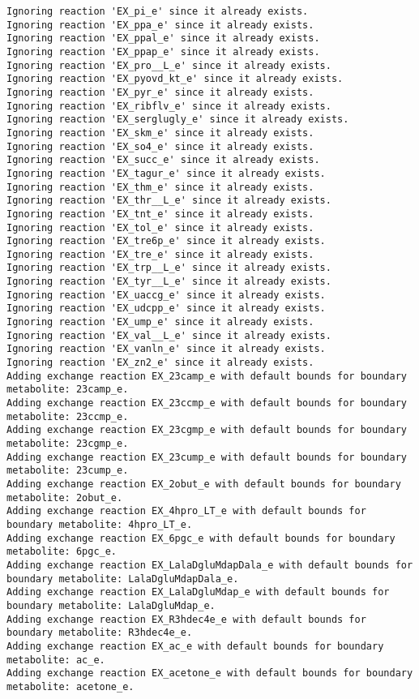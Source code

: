 \documentclass[
  letterpaper,
  DIV=11,
  numbers=noendperiod]{scrartcl}
\begin{document}
\begin{verbatim}
Ignoring reaction 'EX_pi_e' since it already exists.
Ignoring reaction 'EX_ppa_e' since it already exists.
Ignoring reaction 'EX_ppal_e' since it already exists.
Ignoring reaction 'EX_ppap_e' since it already exists.
Ignoring reaction 'EX_pro__L_e' since it already exists.
Ignoring reaction 'EX_pyovd_kt_e' since it already exists.
Ignoring reaction 'EX_pyr_e' since it already exists.
Ignoring reaction 'EX_ribflv_e' since it already exists.
Ignoring reaction 'EX_serglugly_e' since it already exists.
Ignoring reaction 'EX_skm_e' since it already exists.
Ignoring reaction 'EX_so4_e' since it already exists.
Ignoring reaction 'EX_succ_e' since it already exists.
Ignoring reaction 'EX_tagur_e' since it already exists.
Ignoring reaction 'EX_thm_e' since it already exists.
Ignoring reaction 'EX_thr__L_e' since it already exists.
Ignoring reaction 'EX_tnt_e' since it already exists.
Ignoring reaction 'EX_tol_e' since it already exists.
Ignoring reaction 'EX_tre6p_e' since it already exists.
Ignoring reaction 'EX_tre_e' since it already exists.
Ignoring reaction 'EX_trp__L_e' since it already exists.
Ignoring reaction 'EX_tyr__L_e' since it already exists.
Ignoring reaction 'EX_uaccg_e' since it already exists.
Ignoring reaction 'EX_udcpp_e' since it already exists.
Ignoring reaction 'EX_ump_e' since it already exists.
Ignoring reaction 'EX_val__L_e' since it already exists.
Ignoring reaction 'EX_vanln_e' since it already exists.
Ignoring reaction 'EX_zn2_e' since it already exists.
Adding exchange reaction EX_23camp_e with default bounds for boundary metabolite: 23camp_e.
Adding exchange reaction EX_23ccmp_e with default bounds for boundary metabolite: 23ccmp_e.
Adding exchange reaction EX_23cgmp_e with default bounds for boundary metabolite: 23cgmp_e.
Adding exchange reaction EX_23cump_e with default bounds for boundary metabolite: 23cump_e.
Adding exchange reaction EX_2obut_e with default bounds for boundary metabolite: 2obut_e.
Adding exchange reaction EX_4hpro_LT_e with default bounds for boundary metabolite: 4hpro_LT_e.
Adding exchange reaction EX_6pgc_e with default bounds for boundary metabolite: 6pgc_e.
Adding exchange reaction EX_LalaDgluMdapDala_e with default bounds for boundary metabolite: LalaDgluMdapDala_e.
Adding exchange reaction EX_LalaDgluMdap_e with default bounds for boundary metabolite: LalaDgluMdap_e.
Adding exchange reaction EX_R3hdec4e_e with default bounds for boundary metabolite: R3hdec4e_e.
Adding exchange reaction EX_ac_e with default bounds for boundary metabolite: ac_e.
Adding exchange reaction EX_acetone_e with default bounds for boundary metabolite: acetone_e.

\end{verbatim}
\end{document}
